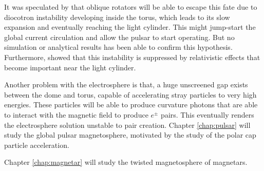 It was speculated by \citet{spitkovsky_electrodynamics_2004} that oblique
rotators will be able to escape this fate due to diocotron instability
developing inside the torus, which leads to its slow expansion and eventually
reaching the light cylinder. This might jump-start the global current
circulation and allow the pulsar to start operating. But no simulation or
analytical results has been able to confirm this hypothesis. Furthermore,
\citet{petri_relativistic_2007} showed that this instability is suppressed by
relativistic effects that become important near the light cylinder.

Another problem with the electrosphere is that, a huge unscreened gap exists
between the dome and torus, capable of accelerating stray particles to very high
energies. These particles will be able to produce curvature photons that are
able to interact with the magnetic field to produce $e^{\pm}$ pairs. This
eventually renders the electrosphere solution unstable to pair creation.
Chapter \ref{chap:pulsar} will study the global pulsar magnetosphere, motivated
by the study of the polar cap particle acceleration.

Chapter \ref{chap:magnetar} will study the twisted magnetosphere of magnetars.


